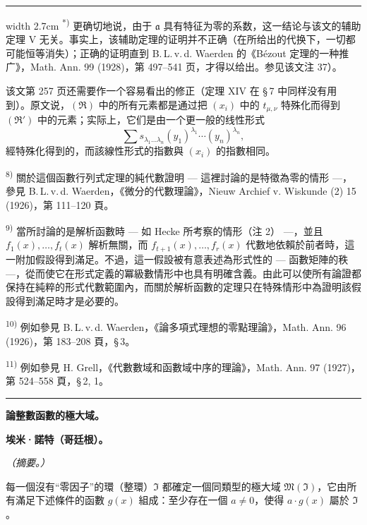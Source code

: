 \documentclass[11pt]{article}
\begin{document}
{\medskip
\hrule width 2.7cm
\smallskip
\noindent\textsuperscript{*)} 更确切地说，由于 $\mathfrak{a}$ 具有特征为零的系数，这一结论与该文的辅助定理 V 无关。事实上，该辅助定理的证明并不正确（在所给出的代换下，一切都可能恒等消失）；正确的证明直到 B.\,L.\,v.\,d. Waerden 的《Bézout 定理的一种推广》，Math. Ann. 99 (1928)，第 497--541 页，才得以给出。参见该文注 37）。

该文第 257 页还需要作一个容易看出的修正（定理 XIV 在 \S\,7 中同样没有用到）。原文说，$(\mathfrak{R})$ 中的所有元素都是通过把 $(x_i)$ 中的 $t_{\mu,\nu}$ 特殊化而得到 $(\mathfrak{R}')$ 中的元素；实际上，它们是由一个更一般的线性形式
\[
\sum s_{\lambda_1\ldots\lambda_n}(y_1)^{\lambda_1}\cdots(y_n)^{\lambda_n},
\]
經特殊化得到的，而該線性形式的指數與 $(x_i)$ 的指數相同。

\noindent\textsuperscript{8)} 關於這個函數行列式定理的純代數證明 --- 這裡討論的是特徵為零的情形 ---，參見 B.\,L.\,v.\,d. Waerden，《微分的代數理論》，Nieuw Archief v. Wiskunde (2) 15 (1926)，第 111--120 頁。

\noindent\textsuperscript{9)} 當所討論的是解析函數時 --- 如 Hecke 所考察的情形（注 2） ---，並且 $f_1(x),\ldots,f_t(x)$ 解析無關，而 $f_{t+1}(x),\ldots,f_r(x)$ 代數地依賴於前者時，這一附加假設得到滿足。不過，這一假設被有意表述為形式性的 --- 函數矩陣的秩 ---，從而使它在形式定義的冪級數情形中也具有明確含義。由此可以使所有論證都保持在純粹的形式代數範圍內，而關於解析函數的定理只在特殊情形中為證明該假設得到滿足時才是必要的。

\noindent\textsuperscript{10)} 例如參見 B.\,L.\,v.\,d. Waerden，《論多項式理想的零點理論》，Math. Ann. 96 (1926)，第 183--208 頁，\S\,3。

\noindent\textsuperscript{11)} 例如參見 H. Grell，《代數數域和函數域中序的理論》，Math. Ann. 97 (1927)，第 524--558 頁，\S\,2, 1。
}

\bigskip
\begin{center}\rule{4cm}{0.4pt}\end{center}
\begingroup
{}
\begin{center}
{\Large\bfseries 論整數函數的極大域。}\par
\vspace{0.7em}
{\bfseries 埃米·諾特（哥廷根）。}\par
\vspace{0.5em}
\emph{（摘要。）}
\end{center}

每一個沒有“零因子”的環（整環）$\mathfrak{I}$ 都確定一個同類型的極大域 $\mathfrak{M}(\mathfrak{I})$，它由所有滿足下述條件的函數 $g(x)$ 組成：至少存在一個 $a\ne0$，使得 $a\cdot g(x)$ 屬於 $\mathfrak{I}$。
\end{document}
